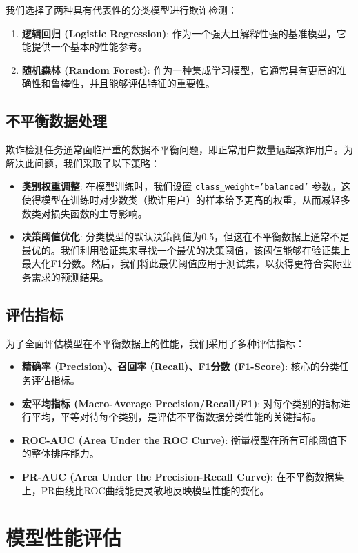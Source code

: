 \documentclass[UTF8]{ctexart}
\begin{document}
我们选择了两种具有代表性的分类模型进行欺诈检测：
\begin{enumerate}
    \item \textbf{逻辑回归 (Logistic Regression)}: 作为一个强大且解释性强的基准模型，它能提供一个基本的性能参考。
    \item \textbf{随机森林 (Random Forest)}: 作为一种集成学习模型，它通常具有更高的准确性和鲁棒性，并且能够评估特征的重要性。
\end{enumerate}

\subsection{不平衡数据处理}

欺诈检测任务通常面临严重的数据不平衡问题，即正常用户数量远超欺诈用户。为解决此问题，我们采取了以下策略：
\begin{itemize}
    \item \textbf{类别权重调整}: 在模型训练时，我们设置 \texttt{class\_weight='balanced'} 参数。这使得模型在训练时对少数类（欺诈用户）的样本给予更高的权重，从而减轻多数类对损失函数的主导影响。
    \item \textbf{决策阈值优化}: 分类模型的默认决策阈值为0.5，但这在不平衡数据上通常不是最优的。我们利用验证集来寻找一个最优的决策阈值，该阈值能够在验证集上最大化F1分数。然后，我们将此最优阈值应用于测试集，以获得更符合实际业务需求的预测结果。
\end{itemize}

\subsection{评估指标}

为了全面评估模型在不平衡数据上的性能，我们采用了多种评估指标：
\begin{itemize}
    \item \textbf{精确率 (Precision)、召回率 (Recall)、F1分数 (F1-Score)}: 核心的分类任务评估指标。
    \item \textbf{宏平均指标 (Macro-Average Precision/Recall/F1)}: 对每个类别的指标进行平均，平等对待每个类别，是评估不平衡数据分类性能的关键指标。
    \item \textbf{ROC-AUC (Area Under the ROC Curve)}: 衡量模型在所有可能阈值下的整体排序能力。
    \item \textbf{PR-AUC (Area Under the Precision-Recall Curve)}: 在不平衡数据集上，PR曲线比ROC曲线能更灵敏地反映模型性能的变化。
\end{itemize}

\section{模型性能评估}
\end{document}
